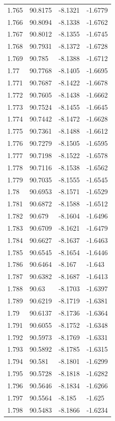 \begin{tabular}{llll}
1.765 & 90.8175 & -8.1321 & -1.6779 \\
1.766 & 90.8094 & -8.1338 & -1.6762 \\
1.767 & 90.8012 & -8.1355 & -1.6745 \\
1.768 & 90.7931 & -8.1372 & -1.6728 \\
1.769 & 90.785 & -8.1388 & -1.6712 \\
1.77 & 90.7768 & -8.1405 & -1.6695 \\
1.771 & 90.7687 & -8.1422 & -1.6678 \\
1.772 & 90.7605 & -8.1438 & -1.6662 \\
1.773 & 90.7524 & -8.1455 & -1.6645 \\
1.774 & 90.7442 & -8.1472 & -1.6628 \\
1.775 & 90.7361 & -8.1488 & -1.6612 \\
1.776 & 90.7279 & -8.1505 & -1.6595 \\
1.777 & 90.7198 & -8.1522 & -1.6578 \\
1.778 & 90.7116 & -8.1538 & -1.6562 \\
1.779 & 90.7035 & -8.1555 & -1.6545 \\
1.78 & 90.6953 & -8.1571 & -1.6529 \\
1.781 & 90.6872 & -8.1588 & -1.6512 \\
1.782 & 90.679 & -8.1604 & -1.6496 \\
1.783 & 90.6709 & -8.1621 & -1.6479 \\
1.784 & 90.6627 & -8.1637 & -1.6463 \\
1.785 & 90.6545 & -8.1654 & -1.6446 \\
1.786 & 90.6464 & -8.167 & -1.643 \\
1.787 & 90.6382 & -8.1687 & -1.6413 \\
1.788 & 90.63 & -8.1703 & -1.6397 \\
1.789 & 90.6219 & -8.1719 & -1.6381 \\
1.79 & 90.6137 & -8.1736 & -1.6364 \\
1.791 & 90.6055 & -8.1752 & -1.6348 \\
1.792 & 90.5973 & -8.1769 & -1.6331 \\
1.793 & 90.5892 & -8.1785 & -1.6315 \\
1.794 & 90.581 & -8.1801 & -1.6299 \\
1.795 & 90.5728 & -8.1818 & -1.6282 \\
1.796 & 90.5646 & -8.1834 & -1.6266 \\
1.797 & 90.5564 & -8.185 & -1.625 \\
1.798 & 90.5483 & -8.1866 & -1.6234 \\

\end{tabular}
